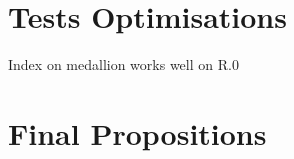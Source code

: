 \section{Tests Optimisations}\label{sec:tests}

Index on medallion works well on R.0

\section{Final Propositions}\label{sec:final}
